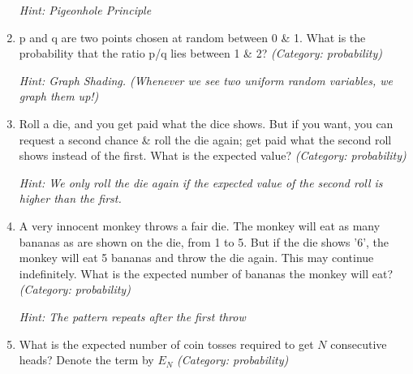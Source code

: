 \begin{enumerate}
\small\emph{Hint: Pigeonhole Principle}





\item p and q are two points chosen at random between 0 \& 1. What is the probability that the ratio p/q lies between 1 \& 2?
\small\emph{(Category: probability)}

\small\emph{Hint: Graph Shading. (Whenever we see two uniform random variables, we graph them up!)}





\item Roll a die, and you get paid what the dice shows. But if you want, you can request a second chance \& roll the die again; get paid what the second roll shows instead of the first. What is the expected value?
\small\emph{(Category: probability)}

\small\emph{Hint: We only roll the die again if the expected value of the second roll is higher than the first.}





\item A very innocent monkey throws a fair die. The monkey will eat as many bananas as are shown on the die, from 1 to 5. But if the die shows '6', the monkey will eat 5 bananas and throw the die again. This may continue indefinitely. What is the expected number of bananas the monkey will eat?
\small\emph{(Category: probability)}

\small\emph{Hint: The pattern repeats after the first throw}





\item What is the expected number of coin tosses required to get $N$ consecutive heads?
Denote the term by $E_N$
\small\emph{(Category: probability)}


\end{enumerate}
